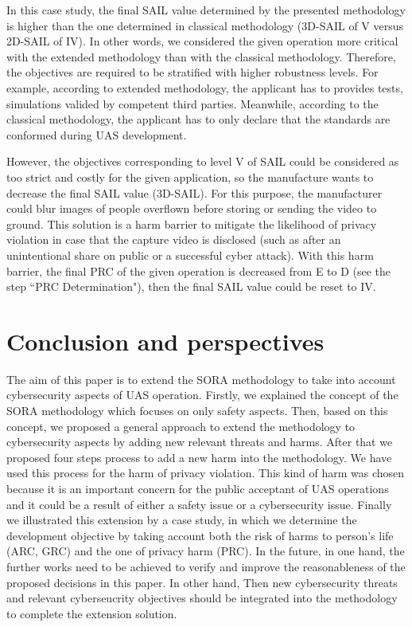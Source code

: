 \documentclass[a4paper, 10, conference]{ieeeconf}  %
\begin{document}
In this case study, the final SAIL value determined by the presented methodology is higher than the one determined in classical methodology (3D-SAIL of V versus 2D-SAIL of IV). In other words, we considered the given operation more critical with the extended methodology than with the classical methodology. Therefore, the objectives are required to be stratified with higher robustness levels. For example, according to extended methodology, the applicant has to provides tests, simulations valided by competent third parties. Meanwhile, according to the classical methodology, the applicant has to only declare that the standards are conformed during UAS development.

However, the objectives corresponding to level V of SAIL could be considered as too strict and costly for the given application, so the manufacture wants to decrease the final SAIL value (3D-SAIL). For this purpose, the manufacturer could blur images of people overflown before storing or sending the video to ground. This solution is a harm barrier to mitigate the likelihood of privacy violation in case that the capture video is disclosed (such as after an unintentional share on public or a successful cyber attack). With this harm barrier, the final PRC of the given operation is decreased from E to D (see the step ``PRC Determination"), then the final SAIL value could be reset to IV.


 
\section{Conclusion and perspectives} \label{sec:con}
The aim of this paper is to extend the SORA methodology to take into account cybersecurity aspects of UAS operation.
Firstly, we explained the concept of the SORA methodology which focuses on only safety aspects.
Then, based on this concept, we proposed a general approach to extend the methodology to cybersecurity aspects by adding new relevant threats and harms. After that we proposed four steps process to add a new harm into the methodology. We have used this process for the harm of privacy violation. This kind of harm was chosen because it is an important concern for the public acceptant of UAS operations and it could be a result of either a safety issue or a cybersecurity issue. Finally we illustrated this extension by a case study, in which we determine the development objective by taking account both the risk of harms to person's life (ARC, GRC) and the one of privacy harm (PRC). In the future, in one hand, the further works need to be achieved to verify and improve the reasonableness of the proposed decisions in this paper. In other hand, Then new cybersecurity threats and relevant cyberseucrity objectives should be integrated into the methodology to complete the extension solution.





\end{document}
